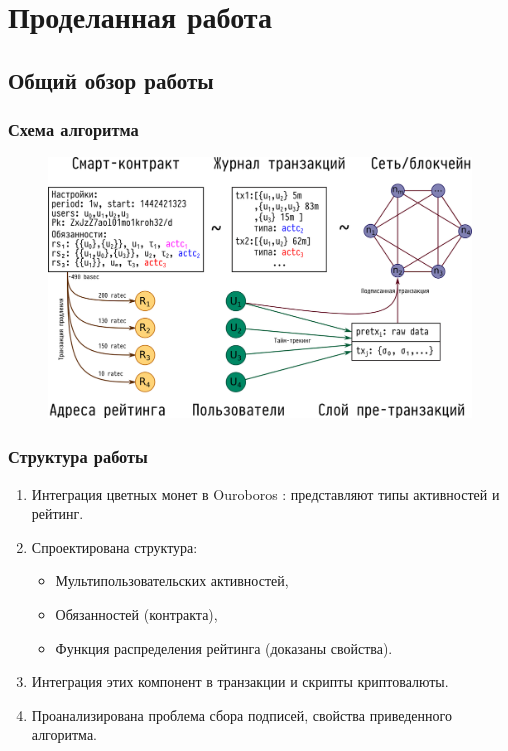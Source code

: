 \documentclass[11pt,handout,pdf,hyperref={unicode}]{beamer}
\begin{document}
\section{Проделанная работа}

\subsection{Общий обзор работы}

\begin{frame}
  \frametitle{Схема алгоритма}
  \begin{figure}[t]
  \includegraphics{presentation_big_scheme}
  \centering
  \end{figure}

\end{frame}

\begin{frame}
  \frametitle{Структура работы}

  \begin{enumerate}
  \item Интеграция цветных монет в Ouroboros \parencite{ouroboros}:
    представляют типы активностей и рейтинг.
  \item Спроектирована структура:
    \begin{itemize}
    \item Мультипользовательских активностей,
    \item Обязанностей (контракта),
    \item Функция распределения рейтинга (доказаны свойства).
    \end{itemize}
  \item Интеграция этих компонент в транзакции и скрипты криптовалюты.
  \item Проанализирована проблема сбора подписей, свойства
    приведенного алгоритма.
  \end{enumerate}

\end{frame}
\end{document}
